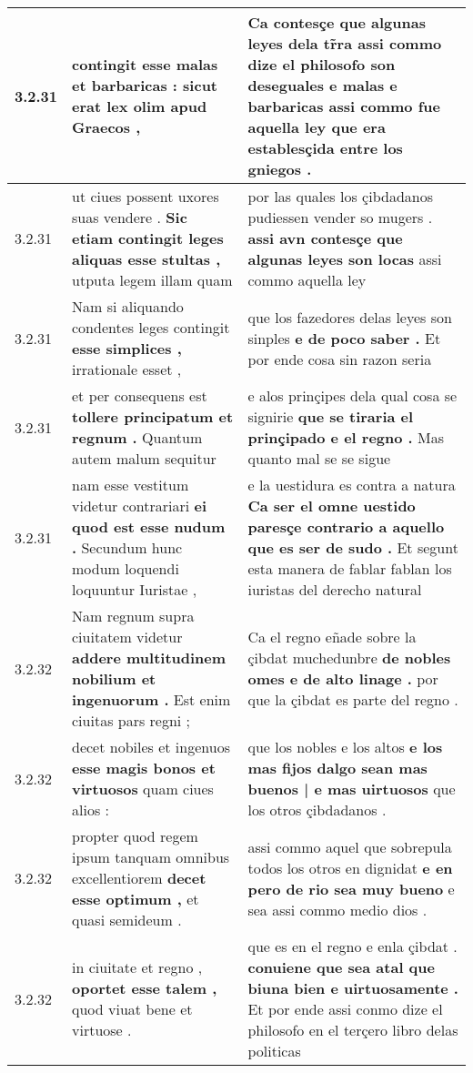 \begin{tabular}{|p{1cm}|p{6.5cm}|p{6.5cm}|}
3.2.31 & contingit \textbf{ esse malas et barbaricas : } sicut erat lex olim apud Graecos , & Ca contesçe que algunas leyes dela tr̃ra \textbf{ assi commo dize el philosofo son deseguales e malas e barbaricas } assi commo fue aquella ley que era establesçida entre los gniegos . \\\hline
3.2.31 & ut ciues possent uxores suas vendere . \textbf{ Sic etiam contingit leges aliquas esse stultas , } utputa legem illam quam & por las quales los çibdadanos pudiessen vender so mugers . \textbf{ assi avn contesçe que algunas leyes son locas } assi commo aquella ley \\\hline
3.2.31 & Nam si aliquando condentes leges contingit \textbf{ esse simplices , } irrationale esset , & que los fazedores delas leyes son sinples \textbf{ e de poco saber . } Et por ende cosa sin razon seria \\\hline
3.2.31 & et per consequens est \textbf{ tollere principatum et regnum . } Quantum autem malum sequitur & e alos prinçipes dela qual cosa se signirie \textbf{ que se tiraria el prinçipado e el regno . } Mas quanto mal se se sigue \\\hline
3.2.31 & nam esse vestitum videtur contrariari \textbf{ ei quod est esse nudum . } Secundum hunc modum loquendi loquuntur Iuristae , & e la uestidura es contra a natura \textbf{ Ca ser el omne uestido paresçe contrario a aquello que es ser de sudo . } Et segunt esta manera de fablar fablan los iuristas del derecho natural \\\hline
3.2.32 & Nam regnum supra ciuitatem videtur \textbf{ addere multitudinem nobilium et ingenuorum . } Est enim ciuitas pars regni ; & Ca el regno eñade sobre la çibdat muchedunbre \textbf{ de nobles omes e de alto linage . } por que la çibdat es parte del regno . \\\hline
3.2.32 & decet nobiles et ingenuos \textbf{ esse magis bonos et virtuosos } quam ciues alios : & que los nobles e los altos \textbf{ e los mas fijos dalgo sean mas buenos | e mas uirtuosos } que los otros çibdadanos . \\\hline
3.2.32 & propter quod regem ipsum tanquam omnibus excellentiorem \textbf{ decet esse optimum , } et quasi semideum . & assi commo aquel que sobrepula todos los otros en dignidat \textbf{ e en pero de rio sea muy bueno } e sea assi commo medio dios . \\\hline
3.2.32 & in ciuitate et regno , \textbf{ oportet esse talem , } quod viuat bene et virtuose . & que es en el regno e enla çibdat . \textbf{ conuiene que sea atal que biuna bien e uirtuosamente . } Et por ende assi conmo dize el philosofo en el terçero libro delas politicas \\\hline

\end{tabular}
